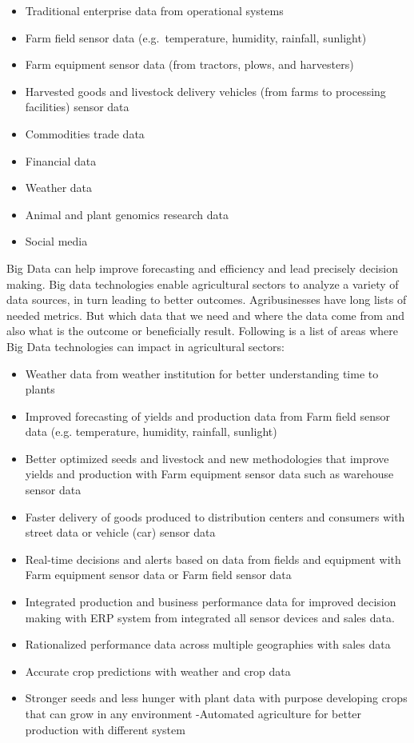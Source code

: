 \documentclass[]{book}
\providecommand{\tightlist}{%
  \setlength{\itemsep}{0pt}\setlength{\parskip}{0pt}}
\begin{document}
\begin{itemize}
\tightlist
\item
  Traditional enterprise data from operational systems
\item
  Farm field sensor data (e.g.~temperature, humidity, rainfall,
  sunlight)
\item
  Farm equipment sensor data (from tractors, plows, and harvesters)
\item
  Harvested goods and livestock delivery vehicles (from farms to
  processing facilities) sensor data
\item
  Commodities trade data
\item
  Financial data
\item
  Weather data
\item
  Animal and plant genomics research data
\item
  Social media
\end{itemize}

Big Data can help improve forecasting and efficiency and lead precisely
decision making. Big data technologies enable agricultural sectors to
analyze a variety of data sources, in turn leading to better outcomes.
Agribusinesses have long lists of needed metrics. But which data that we
need and where the data come from and also what is the outcome or
beneficially result. Following is a list of areas where Big Data
technologies can impact in agricultural sectors:

\begin{itemize}
\tightlist
\item
  Weather data from weather institution for better understanding time to
  plants
\item
  Improved forecasting of yields and production data from Farm field
  sensor data (e.g. temperature, humidity, rainfall, sunlight)
\item
  Better optimized seeds and livestock and new methodologies that
  improve yields and production with Farm equipment sensor data such as
  warehouse sensor data
\item
  Faster delivery of goods produced to distribution centers and
  consumers with street data or vehicle (car) sensor data
\item
  Real-time decisions and alerts based on data from fields and equipment
  with Farm equipment sensor data or Farm field sensor data
\item
  Integrated production and business performance data for improved
  decision making with ERP system from integrated all sensor devices and
  sales data.
\item
  Rationalized performance data across multiple geographies with sales
  data
\item
  Accurate crop predictions with weather and crop data
\item
  Stronger seeds and less hunger with plant data with purpose developing
  crops that can grow in any environment -Automated agriculture for
  better production with different system
\end{itemize}
\end{document}
